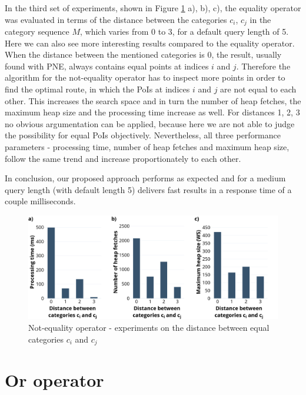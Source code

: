 In the third set of experiments, shown in Figure \ref{fig:neo_distance} a), b), c), the equality operator was evaluated in terms of the  distance between the categories $c_i$, $c_j$ in the category sequence $M$, which varies from 0 to 3, for a default query length of 5.  
Here we can also see more interesting results compared to the equality operator. When the distance between the mentioned categories is 0, the result, usually found with PNE, always contains equal points at indices $i$ and $j$. Therefore the algorithm for the not-equality operator has to inspect more points in order to find the optimal route, in which the PoIs at indices $i$ and $j$ are not equal to each other. This increases the search space and in turn the number of heap fetches, the maximum heap size and the processing time increase as well. For distances 1, 2, 3 no obvious argumentation can be applied, because here we are not able to judge the possibility for equal PoIs objectively.
Nevertheless, all three performance parameters - processing time, number of heap fetches and maximum heap size, follow the same trend and increase proportionately to each other.

In conclusion, our proposed approach performs as expected and for a medium query length (with default length 5) delivers fast results in a response time of a couple milliseconds.

\begin{figure}[H]
	\includegraphics[scale=0.33]{images/neo_distance.png}
	\centering
	\caption{Not-equality operator - experiments on the distance between equal categories $c_i$ and $c_j$}
	\label{fig:neo_distance}
\end{figure}


\section{Or operator}
\label{sec:experimentsOr}

